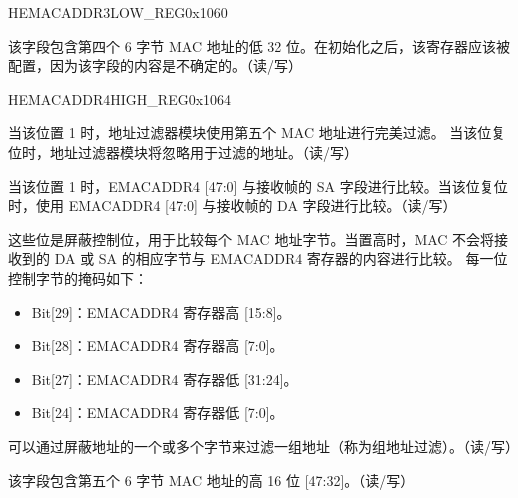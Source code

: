 \begin{register}{H}{EMACADDR3LOW\_REG}{0x1060}\label{regdesc:EMACADDR3LOWREG}
%
\regnewline%
\begin{regdesc}\begin{reglist}
\item [EMACADDR3LOW\_REG]该字段包含第四个 6 字节 MAC 地址的低 32 位。在初始化之后，该寄存器应该被配置，因为该字段的内容是不确定的。（读/写）
\end{reglist}\end{regdesc}
\end{register}

\begin{register}{H}{EMACADDR4HIGH\_REG}{0x1064}\label{regdesc:EMACADDR4HIGHREG}
%
%
%
%
%
\regnewline%
\begin{regdesc}\begin{reglist}
\item [ADDRESS\_ENABLE4]当该位置 1 时，地址过滤器模块使用第五个 MAC 地址进行完美过滤。 当该位复位时，地址过滤器模块将忽略用于过滤的地址。（读/写）
\item [SOURCE\_ADDRESS4]当该位置 1 时，EMACADDR4 [47:0] 与接收帧的 SA 字段进行比较。当该位复位时，使用 EMACADDR4 [47:0] 与接收帧的 DA 字段进行比较。（读/写）
\item [MASK\_BYTE\_CONTROL4] 这些位是屏蔽控制位，用于比较每个 MAC 地址字节。当置高时，MAC 不会将接收到的 DA 或 SA 的相应字节与 EMACADDR4 寄存器的内容进行比较。 每一位控制字节的掩码如下：
\begin{itemize}
\item Bit[29]：EMACADDR4 寄存器高 [15:8]。\item Bit[28]：EMACADDR4 寄存器高 [7:0]。\item Bit[27]：EMACADDR4 寄存器低 [31:24]。\item Bit[24]：EMACADDR4 寄存器低 [7:0]。\end{itemize}
可以通过屏蔽地址的一个或多个字节来过滤一组地址（称为组地址过滤）。（读/写）
\item [MAC\_ADDRESS4\_HI] 该字段包含第五个 6 字节 MAC 地址的高 16 位 [47:32]。（读/写）
\end{reglist}\end{regdesc}
\end{register}


